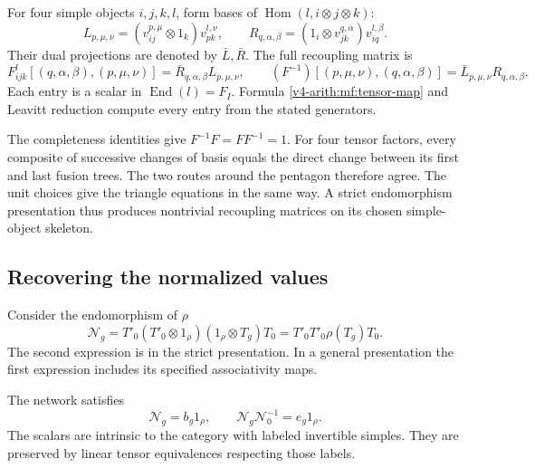 For four simple objects \(i,j,k,l\), form bases of
\(\operatorname{Hom}(l,i\otimes j\otimes k)\):
\[
 L_{p,\mu,\nu}
   =(v_{ij}^{p,\mu}\otimes1_k)v_{pk}^{l,\nu},\qquad
 R_{q,\alpha,\beta}
   =(1_i\otimes v_{jk}^{q,\alpha})v_{iq}^{l,\beta}.
\]
Their dual projections are denoted by \(\bar L,\bar R\).
The full recoupling matrix is
\begin{equation}\label{v4-arith:mf:F}
 F^l_{ijk}[(q,\alpha,\beta),(p,\mu,\nu)]
       =\bar R_{q,\alpha,\beta}L_{p,\mu,\nu},
 \qquad
 (F^{-1})[(p,\mu,\nu),(q,\alpha,\beta)]=\bar L_{p,\mu,\nu}R_{q,\alpha,\beta}.
\end{equation}
Each entry is a scalar in \(\operatorname{End}(l)=F_I\).
Formula \eqref{v4-arith:mf:tensor-map} and Leavitt reduction
compute every entry from the stated generators.

The completeness identities give \(F^{-1}F=FF^{-1}=1\).
For four tensor factors, every composite of successive changes
of basis equals the direct change between its first and last
fusion trees. The two routes around the pentagon therefore agree.
The unit choices give the triangle equations in the same way.
A strict endomorphism presentation thus produces nontrivial
recoupling matrices on its chosen simple-object skeleton.

\subsection{Recovering the normalized values}

Consider the endomorphism of \(\rho\)
\begin{equation}\label{v4-arith:mf:network}
 \mathcal N_g
 =T'_0(T'_0\otimes1_\rho)(1_\rho\otimes T_g)T_0
 =T'_0T'_0\rho(T_g)T_0.
\end{equation}
The second expression is in the strict presentation.
In a general presentation the first expression includes its
specified associativity maps.

\begin{proposition}\label{v4-arith:mf:network-value}
The network satisfies
\[
 \mathcal N_g=b_g1_\rho,\qquad
 \mathcal N_g\mathcal N_0^{-1}=e_g1_\rho.
\]
The scalars are intrinsic to the category with labeled invertible
simples. They are preserved by linear tensor equivalences respecting
those labels.
\end{proposition}

